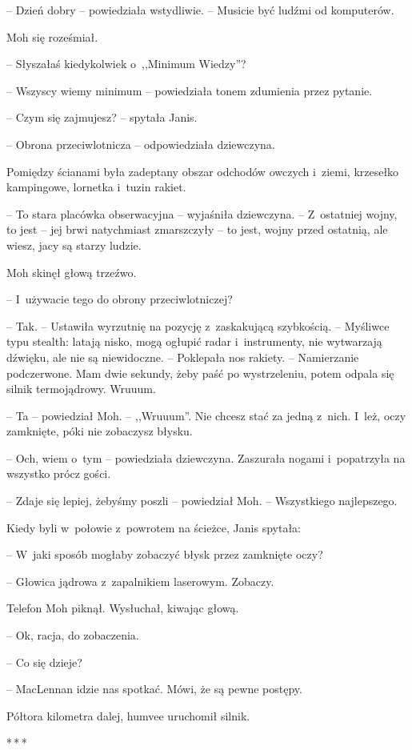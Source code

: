 \documentclass[oneside,polish,11pt,sfheadings]{mwbk}
\newcommand{\threeast}{\bigskip\par\centerline{*\,*\,*}\medskip\par}%
\begin{document}
-- Dzień dobry -- powiedziała wstydliwie. -- Musicie być ludźmi od
komputerów.

Moh się roześmiał. 

-- Słyszałaś kiedykolwiek o~,,Minimum Wiedzy''?

-- Wszyscy wiemy minimum -- powiedziała tonem zdumienia przez pytanie.

-- Czym się zajmujesz? -- spytała Janis.

-- Obrona przeciwlotnicza -- odpowiedziała dziewczyna.

Pomiędzy ścianami była zadeptany obszar odchodów owczych i~ziemi,
krzesełko kampingowe, lornetka i~tuzin rakiet.

-- To stara placówka obserwacyjna -- wyjaśniła dziewczyna. -- Z~ostatniej
wojny, to jest -- jej brwi natychmiast zmarszczyły -- to jest, wojny przed
ostatnią, ale wiesz, jacy są starzy ludzie.

Moh skinęł głową trzeźwo. 

-- I~używacie tego do obrony przeciwlotniczej?

-- Tak. -- Ustawiła wyrzutnię na pozycję z~zaskakującą szybkością. -- Myśliwce typu stealth: latają nisko, mogą ogłupić radar i~instrumenty,
nie wytwarzają dźwięku, ale nie są niewidoczne. -- Poklepała nos rakiety.
-- Namierzanie podczerwone. Mam dwie sekundy, żeby paść po wystrzeleniu,
potem odpala się silnik termojądrowy. Wruuum.

-- Ta -- powiedział Moh. -- ,,Wruuum''. Nie chcesz stać za jedną z~nich. I~leż, oczy zamknięte, póki nie zobaczysz błysku.

-- Och, wiem o~tym -- powiedziała dziewczyna. Zaszurała nogami i~popatrzyła na wszystko prócz gości.

-- Zdaje się lepiej, żebyśmy poszli -- powiedział Moh. -- Wszystkiego
najlepszego.

Kiedy byli w~połowie z~powrotem na ścieżce, Janis spytała: 

-- W~jaki
sposób mogłaby zobaczyć błysk przez zamknięte oczy?

-- Głowica jądrowa z~zapalnikiem laserowym. Zobaczy.

Telefon Moh piknął. Wysłuchał, kiwając głową. 

-- Ok, racja, do
zobaczenia.

-- Co się dzieje?

-- MacLennan idzie nas spotkać. Mówi, że są pewne postępy.

Półtora kilometra dalej, humvee uruchomił silnik.
  \threeast 
\end{document}
